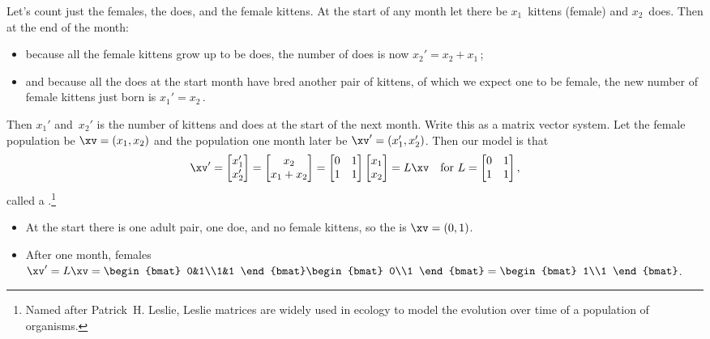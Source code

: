 \begin{reduce}
\begin{example}
Let's count just the females, the does, and the female kittens.
At the start of any month let there be \(x_1\)~kittens (female) and \(x_2\)~does.
Then at the end of the month:
\begin{itemize}
\item because all the female kittens grow up to be does, the number of does is now \(x_2'=x_2+x_1\)\,;
\item and because all the does at the start month have bred another pair of kittens, of which we expect one to be female, the new number of female kittens just born is \(x_1'=x_2\)\,.
\end{itemize}
Then \(x_1'\) and~\(x_2'\) is the number of kittens and does at the start of the next month.
Write this as a matrix vector system.
Let the female population be \(\xv=(x_1,x_2)\) and the population one month later be \(\xv'=(x_1',x_2')\).
Then our model is that
\begin{equation*}
\xv'=\begin{bmatrix} x_1'\\x_2' \end{bmatrix}
=\begin{bmatrix} x_2\\x_1+x_2 \end{bmatrix}
=\begin{bmatrix} 0&1\\1&1 \end{bmatrix}\begin{bmatrix} x_1\\x_2 \end{bmatrix}
=L\xv
\quad\text{for }L=\begin{bmatrix} 0&1\\1&1 \end{bmatrix},
\end{equation*}
called a .\footnote{%
Named after Patrick~H. Leslie, Leslie matrices are widely used in ecology to model the evolution over time of a population of organisms.}
\begin{itemize}
\item At the start there is one adult pair, one doe, and no female kittens, so the  is \(\xv=(0,1)\).
\item After one month,  females \(\xv'=L\xv=\begin{bmat} 0&1\\1&1 \end{bmat}\begin{bmat} 0\\1 \end{bmat}=\begin{bmat} 1\\1 \end{bmat}\).

\end{itemize}
\end{example}
\end{reduce}
